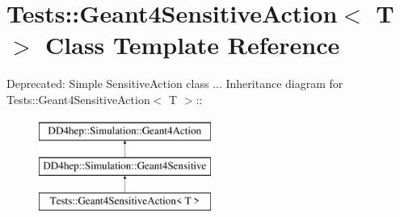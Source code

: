 \hypertarget{class_tests_1_1_geant4_sensitive_action}{
\section{Tests::Geant4SensitiveAction$<$ T $>$ Class Template Reference}
\label{class_tests_1_1_geant4_sensitive_action}
}


Deprecated: Simple SensitiveAction class ...  
Inheritance diagram for Tests::Geant4SensitiveAction$<$ T $>$::\begin{figure}[H]
\begin{center}
\leavevmode
\includegraphics[height=3cm]{class_tests_1_1_geant4_sensitive_action}
\end{center}
\end{figure}
